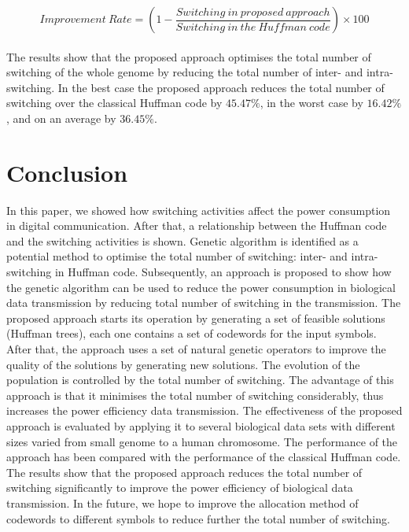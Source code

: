 \documentclass[preprint,12pt]{elsarticle}
\begin{document}
\begin{equation}
Improvement~ Rate = (1-\frac{Switching~ in ~proposed~ approach}{Switching~ in ~ the ~Huffman ~code})\times 100
\end{equation}
 \\The results show that the proposed approach optimises the total number of switching  of the whole genome by reducing the total number of inter- and intra-switching. In the best case the proposed approach reduces the total number of switching over the classical Huffman code by $45.47\%$, in the worst case by $16.42\%$, and on an average by $36.45\%$. 
 
\section{Conclusion}
In this paper, we showed how switching activities affect the power consumption in digital communication. After that, a relationship between the Huffman code and the switching activities is shown. Genetic
algorithm is identified as a potential method to optimise the total number of  switching: inter- and intra-switching in Huffman code.  Subsequently, an approach is proposed to show how the genetic algorithm can be used to reduce the power consumption in biological data transmission by reducing total number of switching in the  transmission. The proposed approach starts its operation by generating a set of feasible solutions (Huffman trees), each one contains a set of codewords for the input symbols. After that, the approach uses a set of natural genetic operators to improve the quality of the solutions by generating new solutions. The evolution of the population is controlled by the total number of switching. The advantage of this approach is that it minimises the total number of switching considerably, thus increases the power efficiency data transmission.   
The effectiveness of the proposed approach is evaluated by applying it to several biological data sets with different sizes varied from small genome to a human chromosome. The performance of the approach has been compared with the performance of the classical Huffman code. The results show that the proposed approach reduces the total number of switching significantly to improve the power efficiency of biological data transmission. %
In the future, we hope to improve the allocation method of codewords to different symbols to reduce further the total number of switching.
\end{document}
